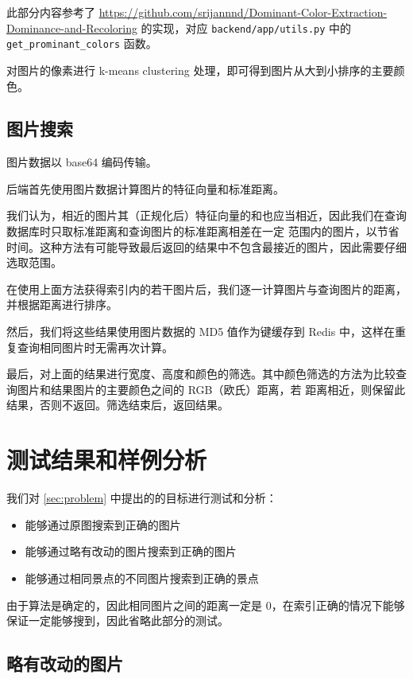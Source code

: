 \documentclass[a4paper]{article}
\begin{document}
此部分内容参考了 \hyperlink{Dominant-Color-Extraction-Dominance-and-Recoloring}{https://github.com/srijannnd/Dominant-Color-Extraction-Dominance-and-Recoloring}
的实现，对应 \texttt{backend/app/utils.py} 中的\\ \texttt{get\_prominant\_colors} 函数。

对图片的像素进行 k-means clustering 处理，即可得到图片从大到小排序的主要颜色。

\subsection{图片搜索}

图片数据以 base64 编码传输。

后端首先使用图片数据计算图片的特征向量和标准距离。

我们认为，相近的图片其（正规化后）特征向量的和也应当相近，因此我们在查询数据库时只取标准距离和查询图片的标准距离相差在一定
范围内的图片，以节省时间。这种方法有可能导致最后返回的结果中不包含最接近的图片，因此需要仔细选取范围。

在使用上面方法获得索引内的若干图片后，我们逐一计算图片与查询图片的距离，并根据距离进行排序。

然后，我们将这些结果使用图片数据的 MD5 值作为键缓存到 Redis 中，这样在重复查询相同图片时无需再次计算。

最后，对上面的结果进行宽度、高度和颜色的筛选。其中颜色筛选的方法为比较查询图片和结果图片的主要颜色之间的 RGB（欧氏）距离，若
距离相近，则保留此结果，否则不返回。筛选结束后，返回结果。

\section{测试结果和样例分析}

我们对 \ref{sec:problem} 中提出的的目标进行测试和分析：

\begin{itemize}
    \item 能够通过原图搜索到正确的图片
    \item 能够通过略有改动的图片搜索到正确的图片
    \item 能够通过相同景点的不同图片搜索到正确的景点
\end{itemize}

由于算法是确定的，因此相同图片之间的距离一定是 0，在索引正确的情况下能够保证一定能够搜到，因此省略此部分的测试。

\subsection{略有改动的图片}
\end{document}
